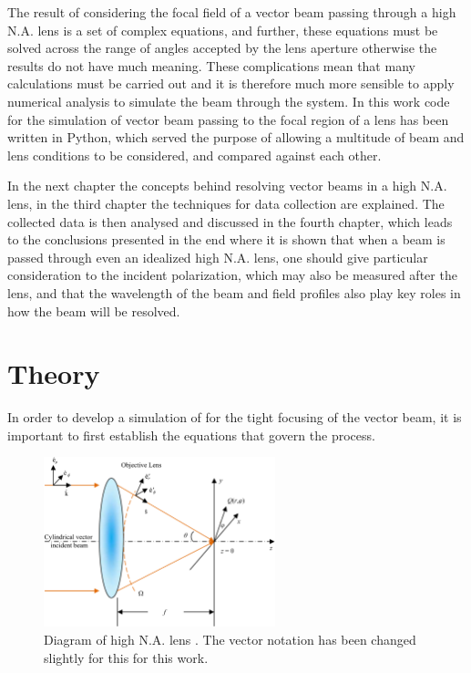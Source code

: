 \documentclass[12pt,a4paper]{article}
\begin{document}
The result of considering the focal field of a vector beam passing through a high N.A. lens is a set of complex equations, and further, these equations must be solved across the range of angles accepted by the lens aperture otherwise the results do not have much meaning. These complications mean that many calculations must be carried out and it is therefore much more sensible to apply numerical analysis to simulate the beam through the system. In this work code for the simulation of vector beam passing to the focal region of a lens has been written in Python, which served the purpose of allowing a multitude of beam and lens conditions to be considered, and compared against each other.

In the next chapter the concepts behind resolving vector beams in a high N.A. lens, in the third chapter the techniques for data collection are explained. The collected data is then analysed and discussed in the fourth chapter, which leads to the conclusions presented in the end where it is shown that when a beam is passed through even an idealized high N.A. lens, one should give particular consideration to the incident polarization, which may also be measured after the lens, and that the wavelength of the beam and field profiles also play key roles in how the beam will be resolved.
%
\section{Theory}
In order to develop a simulation of for the tight focusing of the vector beam, it is important to first establish the equations that govern the process.
\begin{figure}[htb]
\centering\includegraphics[width = 0.6\textwidth]{Lensdiagram}
\caption{Diagram of high N.A. lens \cite{Zhan}. The vector notation has been changed slightly for this for this work.}
\label{fig:LensDia}
\end{figure}
\end{document}
